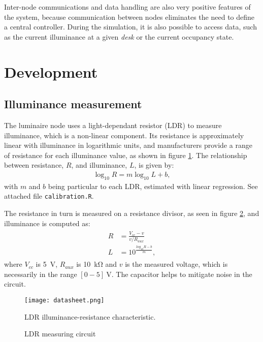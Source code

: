 \documentclass[english,fira]{ist-report}
\begin{document}
Inter-node communications and data handling are also very positive features of the system, because communication between nodes eliminates the need to define a central controller. During the simulation, it is also possible to access data, such as the current illuminance at a given \textit{desk} or the current occupancy state. 

\section{Development} \label{development}

\subsection{Illuminance measurement}

The luminaire node uses a light-dependant resistor (LDR) to measure illuminance, which is a non-linear component. 
Its resistance is approximately linear with illuminance in logarithmic units, and manufacturers provide a range of resistance for each illuminance value, as shown in figure \ref{fig:ldr-characteristic}.
The relationship between resistance, $R$, and illuminance, $L$, is given by:
\begin{align}
    \log_{10} R = m \log_{10} L + b, \label{eq:r-l-log}
\end{align}
with $m$ and $b$ being particular to each LDR, estimated with linear regression. See attached file \texttt{calibration.R}.

The resistance in turn is measured on a resistance divisor, as seen in figure \ref{fig:ldr-circuit}, and illuminance is computed as:
\begin{align}
\begin{aligned}
    R &= \frac{V_{cc} - v}{v/R_{aux}}\\
    L &= 10^{\frac{log_{10}R-b}{m}}, 
\end{aligned}
\label{eq:L-calc}
\end{align}
where $V_{cc}$ is \SI{5}{\volt}, $R_{aux}$ is \SI{10}{\kilo\ohm} and $v$ is the measured voltage, which is necessarily in the range $[0-5]\SI{}{\volt}$. The capacitor helps to mitigate noise in the circuit.

\begin{figure}[ht]
    \centering
    \texttt{[image: datasheet.png]}
    \caption{LDR illuminance-resistance characteristic.}
    \label{fig:ldr-characteristic}
\end{figure}
\begin{figure}[ht]
    \centering
    
    \caption{LDR measuring circuit}
    \label{fig:ldr-circuit}
\end{figure}
\end{document}
